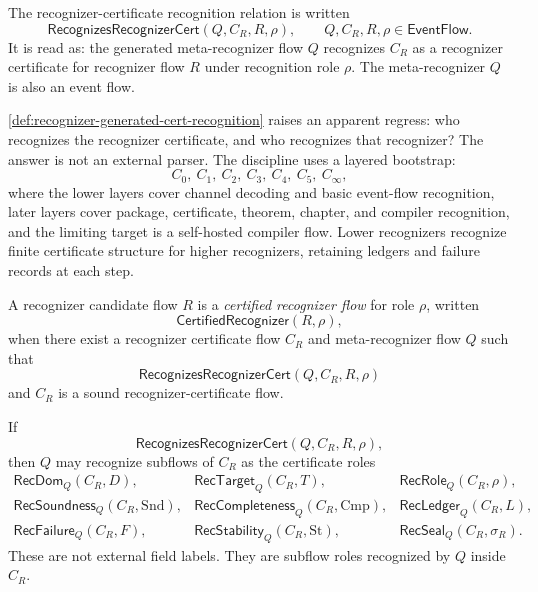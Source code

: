 \begin{definition}
\label{def:recognizer-generated-cert-recognition}
The recognizer-certificate recognition relation is written
$$
  \mathsf{RecognizesRecognizerCert}(Q,C_R,R,\rho),
  \qquad
  Q,C_R,R,\rho\in\mathsf{EventFlow}.
$$
It is read as: the generated meta-recognizer flow $Q$ recognizes $C_R$ as a recognizer certificate for recognizer flow $R$ under recognition role $\rho$. The meta-recognizer $Q$ is also an event flow.
\end{definition}

\begin{remark}
\label{rem:recognizer-generated-layered-bootstrap}
\autoref{def:recognizer-generated-cert-recognition} raises an apparent regress: who recognizes the recognizer certificate, and who recognizes that recognizer? The answer is not an external parser. The discipline uses a layered bootstrap:
$$
  C_0,\ C_1,\ C_2,\ C_3,\ C_4,\ C_5,\ C_\infty,
$$
where the lower layers cover channel decoding and basic event-flow recognition, later layers cover package, certificate, theorem, chapter, and compiler recognition, and the limiting target is a self-hosted compiler flow. Lower recognizers recognize finite certificate structure for higher recognizers, retaining ledgers and failure records at each step.
\end{remark}

\begin{definition}
\label{def:recognizer-generated-certified-recognizer}
A recognizer candidate flow $R$ is a \emph{certified recognizer flow} for role $\rho$, written
$$
  \mathsf{CertifiedRecognizer}(R,\rho),
$$
when there exist a recognizer certificate flow $C_R$ and meta-recognizer flow $Q$ such that
$$
  \mathsf{RecognizesRecognizerCert}(Q,C_R,R,\rho)
$$
and $C_R$ is a sound recognizer-certificate flow.
\end{definition}

\begin{definition}
\label{def:recognizer-generated-certificate-fields}
If
$$
  \mathsf{RecognizesRecognizerCert}(Q,C_R,R,\rho),
$$
then $Q$ may recognize subflows of $C_R$ as the certificate roles
$$
\begin{array}{lll}
  \mathsf{RecDom}_Q(C_R,D),&
  \mathsf{RecTarget}_Q(C_R,T),&
  \mathsf{RecRole}_Q(C_R,\rho),\\
  \mathsf{RecSoundness}_Q(C_R,\mathrm{Snd}),&
  \mathsf{RecCompleteness}_Q(C_R,\mathrm{Cmp}),&
  \mathsf{RecLedger}_Q(C_R,L),\\
  \mathsf{RecFailure}_Q(C_R,F),&
  \mathsf{RecStability}_Q(C_R,\mathrm{St}),&
  \mathsf{RecSeal}_Q(C_R,\sigma_R).
\end{array}
$$
These are not external field labels. They are subflow roles recognized by $Q$ inside $C_R$.
\end{definition}

